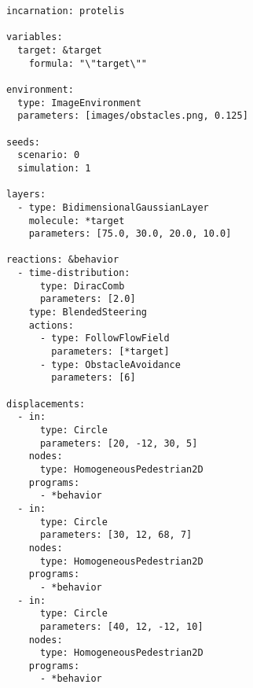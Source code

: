 \begin{verbatim}
incarnation: protelis

variables:
  target: &target
    formula: "\"target\""

environment:
  type: ImageEnvironment
  parameters: [images/obstacles.png, 0.125]

seeds:
  scenario: 0
  simulation: 1

layers:
  - type: BidimensionalGaussianLayer
    molecule: *target
    parameters: [75.0, 30.0, 20.0, 10.0]

reactions: &behavior
  - time-distribution:
      type: DiracComb
      parameters: [2.0]
    type: BlendedSteering
    actions:
      - type: FollowFlowField
        parameters: [*target]
      - type: ObstacleAvoidance
        parameters: [6]

displacements:
  - in:
      type: Circle
      parameters: [20, -12, 30, 5]
    nodes:
      type: HomogeneousPedestrian2D
    programs:
      - *behavior
  - in:
      type: Circle
      parameters: [30, 12, 68, 7]
    nodes:
      type: HomogeneousPedestrian2D
    programs:
      - *behavior
  - in:
      type: Circle
      parameters: [40, 12, -12, 10]
    nodes:
      type: HomogeneousPedestrian2D
    programs:
      - *behavior
\end{verbatim}